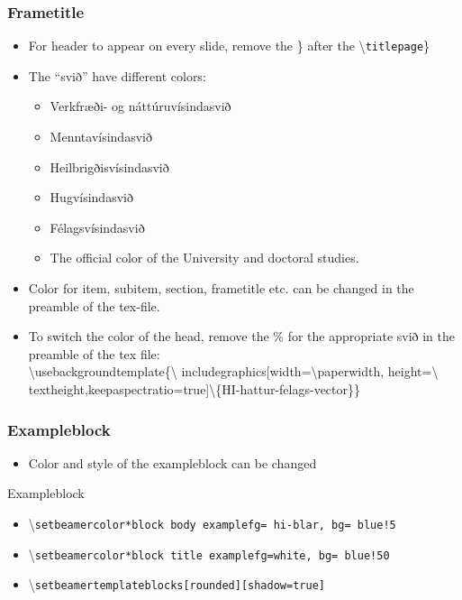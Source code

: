 \documentclass[hi-blar]{beamer}
\begin{document}
\begin{frame}
\frametitle{Frametitle}

\begin{itemize}
\item For header to appear on every slide, remove the{ \} after the
  \textbackslash\texttt{titlepage}\}}
\item The ``svið'' have different colors:
\begin{itemize}
\item {\color{hi-verkraun}Verkfræði- og náttúruvísindasvið} 
\item {\color{hi-mennt}Menntavísindasvið}
\item {\color{hi-heil}Heilbrigðisvísindasvið}
\item {\color{hi-hug}Hugvísindasvið} 
\item {\color{hi-fel}Félagsvísindasvið}
\item {\color{hi-blar}The official color of the University and
    doctoral studies.}
\end{itemize}
\item Color for item, subitem, section, frametitle etc. can be
  changed in the preamble of the tex-file.
\item To switch the color of the head, remove the
  \% for the appropriate svið in the preamble of the tex file:\\
  \textbackslash usebackgroundtemplate\{\textbackslash
  includegraphics[width=\textbackslash paperwidth,
  height=\textbackslash
  textheight,keepaspectratio=true]\textbackslash\{HI-hattur-felags-vector\}\}
\end{itemize}
\end{frame}



\begin{frame}
\frametitle{Exampleblock}

\begin{itemize}
\item Color and style of the exampleblock can be changed
\end{itemize}
\begin{exampleblock}{Exampleblock}
  \begin{itemize}
  \item \textbackslash \texttt{setbeamercolor*{block
        body example}{fg= hi-blar, bg= blue!5}}
\item \textbackslash \texttt{setbeamercolor*{block title example}{fg=white,
bg= blue!50}}
\item \textbackslash \texttt{setbeamertemplate{blocks}[rounded][shadow=true]}
  \end{itemize}
\end{exampleblock}
\end{frame}
\end{document}
